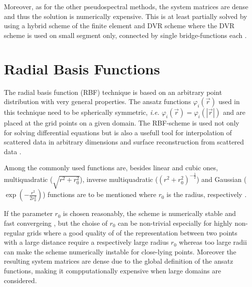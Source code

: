 {Moreover, as for the other pseudospectral methods, the system matrices are dense and thus the solution is numerically expensive.
This is at least partially solved by using a hybrid scheme of the finite element and DVR scheme where the DVR scheme is used on small segment only, connected by single bridge-functions each \cite{taoDVR,impLDVR}.

\section{Radial Basis Functions}
The radial basis function (RBF) technique is based on an arbitrary point distribution with very general properties.
The ansatz functions $\varphi_i(\vec{r})$ used in this technique need to be spherically symmetric, \textit{i.e.} $\varphi_i(\vec{r})=\varphi_i(|\vec{r}|)$ and are placed at the grid points on a given domain.
The RBF-scheme is used not only for solving differential equations but is also a usefull tool for interpolation of scattered data in arbitrary dimensions \cite{rbfInterpol} and surface reconstruction from scattered data \cite{rbfSurf}.

Among the commonly used functions are, besides linear and cubic ones, multiquadratic ($\sqrt { r^2 + r_0^2 }$), inverse multiquadratic ($( r^2 + r_0^2)^{-\frac 12}$) and Gaussian ($ \exp(-\frac{r^2}{2r_0^2})$) functions are to be mentioned where $r_0$ is the radius, respectively \cite{rbfSE,rbfWave}.

If the parameter $r_0$ is chosen reasonably, the scheme is numerically stable and fast convergeing \cite{rbfSE}, but the choise of $r_0$ can be non-trivial especially for highly non-regular grids where a good quality of of the representation between two points with a large distance require a respectively large radius $r_0$ whereas too large radii can make the scheme numerically instable for close-lying points.
Moreover the resulting system matrices are dense due to the global definition of the ansatz functions, making it compputationally expensive when large domains are considered.

}
